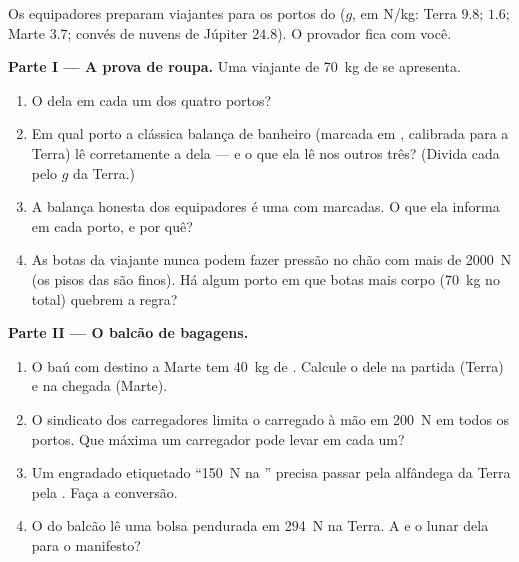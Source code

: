 \begin{problem}\label{pb:g9:weight-vs-mass:1}
Os equipadores preparam viajantes para os portos do 
($g$, em \unit{N/kg}: Terra $9.8$;  $1.6$; Marte $3.7$; convés de
nuvens de Júpiter $24.8$). O provador fica com você.

\medskip\noindent\textbf{Parte I --- A prova de roupa.}
Uma viajante de \qty{70}{kg} de  se apresenta.
\begin{enumerate}
  \item O  dela em cada um dos quatro portos?
  \item Em qual porto a clássica balança de banheiro (marcada em
        , calibrada para a Terra) lê corretamente a 
        dela --- e o que ela lê nos outros três? (Divida cada 
        pelo $g$ da Terra.)
  \item A balança honesta dos equipadores é uma  com
         marcadas. O que ela informa em cada porto, e por quê?
  \item As botas da viajante nunca podem fazer pressão no chão com
        mais de \qty{2000}{N} (os pisos das  são finos). Há
        algum porto em que botas mais corpo (\qty{70}{kg} no total)
        quebrem a regra?
\end{enumerate}

\medskip\noindent\textbf{Parte II --- O balcão de bagagens.}
\begin{enumerate}[resume]
  \item O baú com destino a Marte tem \qty{40}{kg} de . Calcule
        o  dele na partida (Terra) e na chegada (Marte).
  \item O sindicato dos carregadores limita o \emph{} carregado à
        mão em \qty{200}{N} em todos os portos. Que \emph{}
        máxima um carregador pode levar em cada um?
  \item Um engradado etiquetado ``\qty{150}{N} na '' precisa
        passar pela alfândega da Terra pela . Faça a conversão.
  \item O  do balcão lê uma bolsa pendurada em
        \qty{294}{N} na Terra. A  e o  lunar dela para o
        manifesto?
\end{enumerate}


\end{problem}
